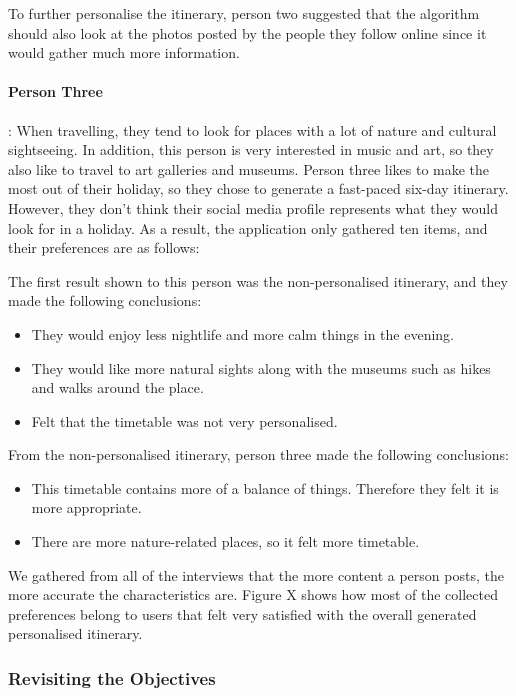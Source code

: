 To further personalise the itinerary, person two suggested that the algorithm
should also look at the photos posted by the people they follow online since it
would gather much more information. 

\paragraph{Person Three}: When travelling, they tend to look for places with a
lot of nature and cultural sightseeing. In addition, this person is very
interested in music and art, so they also like to travel to art galleries and
museums.  Person three likes to make the most out of their holiday, so they
chose to generate a fast-paced six-day itinerary. However, they don't think
their social media profile represents what they would look for in a holiday. As
a result, the application only gathered ten items, and their preferences are as
follows:

The first result shown to this person was the non-personalised itinerary, and
they made the following conclusions: 

\begin{itemize} 
    \item They would enjoy
    less nightlife and more calm things in the evening.  
    \item They would like
    more natural sights along with the museums such as hikes and walks around
    the place.  
    \item Felt that the timetable was not very personalised.
    \end{itemize} 

From the non-personalised itinerary, person three made the
following conclusions:

\begin{itemize} \item This timetable contains more of a balance of things.
Therefore they felt it is more appropriate.  \item There are more
nature-related places, so it felt more timetable.  \end{itemize}
  
We gathered from all of the interviews that the more content a person posts,
the more accurate the characteristics are. Figure X shows how most of the
collected preferences belong to users that felt very satisfied with the overall
generated personalised itinerary.

\subsubsection{Revisiting the Objectives}

